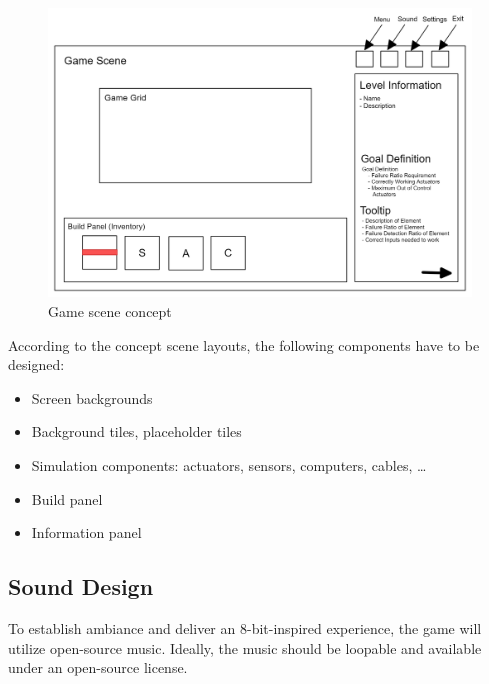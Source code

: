 \begin{figure}
    \includegraphics[width=\textwidth]{Pictures/res/concept/game-scene-concept}
    \caption{Game scene concept}
    \label{fig:game-scene-concept}
\end{figure}
According to the concept scene layouts, the following components have to be designed:
\begin{itemize}
    \item Screen backgrounds
    \item Background tiles, placeholder tiles
    \item Simulation components: actuators, sensors, computers, cables, \ldots
    \item Build panel
    \item Information panel
\end{itemize}

\subsection{Sound Design}\label{subsec:sound-design}
To establish ambiance and deliver an 8-bit-inspired experience, the game will utilize open-source music.
Ideally, the music should be loopable and available under an open-source license.

